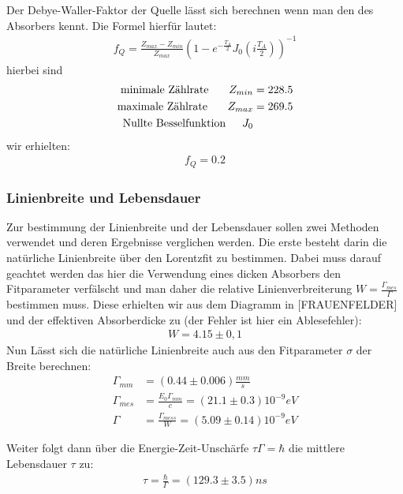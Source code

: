 \documentclass[12pt]{article}
\begin{document}
Der Debye-Waller-Faktor der Quelle lässt sich berechnen wenn man den des Absorbers kennt. Die Formel hierfür lautet:
\begin{align*}
f_Q=\frac{Z_{max} - Z_{min}}{Z_{max}} \left( 1 - e^{-\frac{T_A}{2}} J_0 \left( i \frac{T_A}{2} \right) \right)^{-1}
\end{align*}
hierbei sind 
\begin{align*}
  \textnormal{minimale Zählrate } \hspace{15pt} Z_{min} &= 228.5 \\
  \textnormal{maximale Zählrate } \hspace{15pt} Z_{max} &= 269.5 \\
  \textnormal{Nullte Besselfunktion} \hspace{15pt} J_0
\end{align*}
wir erhielten:
\begin{align*}
f_Q = 0.2
\end{align*}


\subsubsection{Linienbreite und Lebensdauer}
Zur bestimmung der Linienbreite und der Lebensdauer sollen zwei Methoden verwendet und deren Ergebnisse verglichen werden. Die erste besteht darin
die natürliche Linienbreite über den Lorentzfit zu bestimmen. Dabei muss darauf geachtet werden das hier die Verwendung eines dicken Absorbers den
Fitparameter verfälscht und man daher die relative Linienverbreiterung $W = \frac{\Gamma_{mes}}{\Gamma}$ bestimmen muss. Diese erhielten wir aus dem 
Diagramm in [FRAUENFELDER] und der effektiven Absorberdicke zu (der Fehler ist hier ein Ablesefehler):
\begin{align*}
 W = 4.15 \pm 0,1
\end{align*}
Nun Lässt sich die  natürliche Linienbreite auch aus den Fitparameter $\sigma$ der Breite berechnen:
\begin{align*}
 \Gamma_{mm} &= (0.44 \pm 0.006) \frac{mm}{s} \\
 \Gamma_{mes} &= \frac{E_0\Gamma_{mm}}{c} = (21.1 \pm 0.3) 10^{-9}eV \\
 \Gamma &= \frac{\Gamma_{mess}}{W} = (5.09 \pm 0.14) 10^{-9} eV
\end{align*}

Weiter folgt dann über  die Energie-Zeit-Unschärfe $\tau \Gamma = \hbar$ die mittlere Lebensdauer $\tau$ zu:
\begin{align*}
 \tau = \frac{\hbar}{\Gamma} = (129.3 \pm 3.5)ns
\end{align*}
\end{document}
